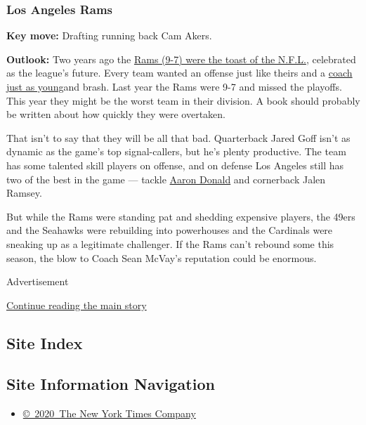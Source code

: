 \hypertarget{los-angeles-rams}{%
\subsubsection{\texorpdfstring{\textbf{Los Angeles
Rams}}{Los Angeles Rams}}\label{los-angeles-rams}}

\textbf{Key move:} Drafting running back Cam Akers.

\textbf{Outlook:} Two years ago the
\href{https://www.nytimes3xbfgragh.onion/2019/02/02/sports/marcus-peters-rams.html}{Rams
(9-7) were the toast of the N.F.L.}, celebrated as the league's future.
Every team wanted an offense just like theirs and a
\href{https://www.nytimes3xbfgragh.onion/2019/01/31/sports/sean-mcvay-los-angeles-rams-super-bowl-liii.html}{coach
just as young}and brash. Last year the Rams were 9-7 and missed the
playoffs. This year they might be the worst team in their division. A
book should probably be written about how quickly they were overtaken.

That isn't to say that they will be all that bad. Quarterback Jared Goff
isn't as dynamic as the game's top signal-callers, but he's plenty
productive. The team has some talented skill players on offense, and on
defense Los Angeles still has two of the best in the game --- tackle
\href{https://www.nytimes3xbfgragh.onion/2019/01/31/sports/football/aaron-donald-rams.html}{Aaron
Donald} and cornerback Jalen Ramsey.

But while the Rams were standing pat and shedding expensive players, the
49ers and the Seahawks were rebuilding into powerhouses and the
Cardinals were sneaking up as a legitimate challenger. If the Rams can't
rebound some this season, the blow to Coach Sean McVay's reputation
could be enormous.

Advertisement

\protect\hyperlink{after-bottom}{Continue reading the main story}

\hypertarget{site-index}{%
\subsection{Site Index}\label{site-index}}

\hypertarget{site-information-navigation}{%
\subsection{Site Information
Navigation}\label{site-information-navigation}}

\begin{itemize}
\tightlist
\item
  \href{https://help.nytimes3xbfgragh.onion/hc/en-us/articles/115014792127-Copyright-notice}{©~2020~The
  New York Times Company}
\end{itemize}


